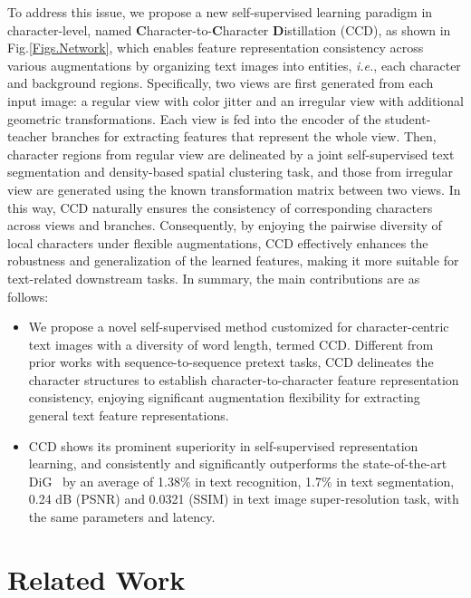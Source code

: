 \documentclass[10pt,twocolumn,letterpaper]{article}
\begin{document}
To address this issue, we propose a new self-supervised learning paradigm in character-level, named \textbf{C}haracter-to-\textbf{C}haracter \textbf{D}istillation (CCD), as shown in Fig.\ref{Figs.Network}, which enables feature representation consistency across various augmentations by organizing text images into entities, \emph{i.e.}, each character and background regions. Specifically, two views are first generated from each input image: a regular view with color jitter and an irregular view with additional geometric transformations. Each view is fed into the encoder of the student-teacher branches for extracting features that represent the whole view. Then, character regions from regular view are delineated by a joint self-supervised text segmentation and density-based spatial clustering task, and those from irregular view are generated using the known transformation matrix between two views. In this way, CCD naturally ensures the consistency of corresponding characters across views and branches.
Consequently, by enjoying the pairwise diversity of local characters under flexible augmentations, CCD effectively enhances the robustness and generalization of the learned features, making it more suitable for text-related downstream tasks. In summary, the main contributions are as follows: 
\begin{itemize}
    \setlength{\itemsep}{1pt}
    \setlength{\parsep}{1pt}
    \setlength{\parskip}{1pt}
    \item We propose a novel self-supervised method customized for character-centric text images with a diversity of word length, termed CCD. Different from prior works with sequence-to-sequence pretext tasks, CCD delineates the character structures to establish character-to-character feature representation consistency, enjoying significant augmentation flexibility for extracting general text feature representations.
    \item CCD shows its prominent superiority in self-supervised representation learning, and consistently and significantly outperforms the state-of-the-art DiG~\cite{DiG} by an average of  1.38\% in text recognition, 1.7\% in text segmentation, 0.24 dB (PSNR) and 0.0321 (SSIM) in text image super-resolution task, with the same parameters and latency. 
\end{itemize}

\section{Related Work}
\end{document}
